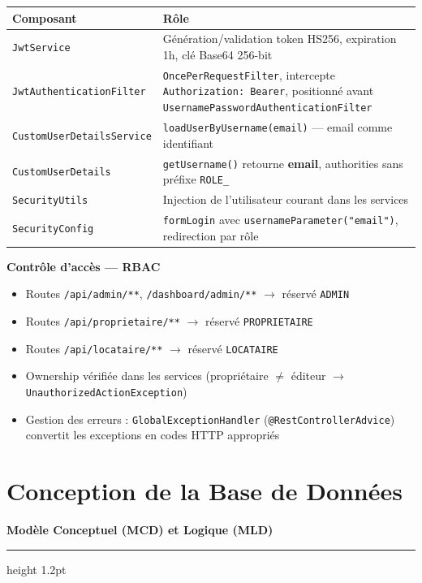 \documentclass[12pt,a4paper]{article}
\newcommand{\sectiontitle}[1]{%
    \vspace{0.6em}\noindent%
    \textcolor{primary}{\large\bfseries #1}%
    \par\vspace{0.3em}%
    \hrule height 1.2pt \vspace{0.4em}%
}
\newcommand{\subtitle}[1]{%
    \vspace{0.4em}\noindent%
    \textcolor{primary!80!black}{\bfseries #1}\par\vspace{0.2em}%
}
\begin{document}
\vspace{0.3em}
\begin{center}
\begin{tabularx}{\textwidth}{l X}
\toprule
\textbf{Composant} & \textbf{Rôle} \\
\midrule
\texttt{JwtService} & Génération/validation token HS256, expiration 1h, clé Base64 256-bit \\
\texttt{JwtAuthenticationFilter} & \texttt{OncePerRequestFilter}, intercepte \texttt{Authorization: Bearer}, positionné avant \texttt{UsernamePasswordAuthenticationFilter} \\
\texttt{CustomUserDetailsService} & \texttt{loadUserByUsername(email)} --- email comme identifiant \\
\texttt{CustomUserDetails} & \texttt{getUsername()} retourne \textbf{email}, authorities sans préfixe \texttt{ROLE\_} \\
\texttt{SecurityUtils} & Injection de l'utilisateur courant dans les services \\
\texttt{SecurityConfig} & \texttt{formLogin} avec \texttt{usernameParameter("email")}, redirection par rôle \\
\bottomrule
\end{tabularx}
\end{center}

\subtitle{Contrôle d'accès --- RBAC}
\begin{itemize}[nosep, leftmargin=1.2em]
    \item Routes \texttt{/api/admin/**}, \texttt{/dashboard/admin/**} $\to$ réservé \texttt{ADMIN}
    \item Routes \texttt{/api/proprietaire/**} $\to$ réservé \texttt{PROPRIETAIRE}
    \item Routes \texttt{/api/locataire/**} $\to$ réservé \texttt{LOCATAIRE}
    \item Ownership vérifiée dans les services (propriétaire $\neq$ éditeur $\to$ \texttt{UnauthorizedActionException})
    \item Gestion des erreurs : \texttt{GlobalExceptionHandler} (\texttt{@RestControllerAdvice}) convertit les exceptions en codes HTTP appropriés
\end{itemize}

\section{Conception de la Base de Données}
\sectiontitle{Modèle Conceptuel (MCD) et Logique (MLD)}
\end{document}
